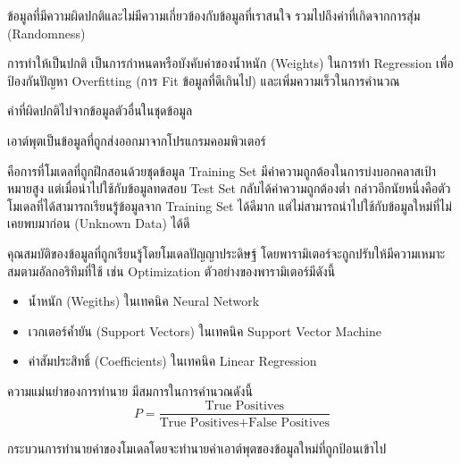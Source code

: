 \begin{description}[style=nextline]
    \item[Noise] ข้อมูลที่มีความผิดปกติและไม่มีความเกี่ยวข้องกับข้อมูลที่เราสนใจ รวมไปถึงค่าที่เกิดจากการสุ่ม (Randomness)

    \item[Normalization] การทำให้เป็นปกติ เป็นการกำหนดหรือบังคับค่าของน้ำหนัก (Weights) ในการทำ Regression เพื่อป้องกันปัญหา
    Overfitting (การ Fit ข้อมูลที่ดีเกินไป) และเพิ่มความเร็วในการคำนวณ

    \item[Outlier] ค่าที่ผิดปกติไปจากข้อมูลตัวอื่นในชุดข้อมูล

    \item[Output] เอาต์พุตเป็นข้อมูลที่ถูกส่งออกมาจากโปรแกรมคอมพิวเตอร์

    \item[Overfitting] คือการที่โมเดลที่ถูกฝึกสอนด้วยชุดข้อมูล Training Set มีค่าความถูกต้องในการบ่งบอกคลาสเป้าหมายสูง 
    แต่เมื่อนำไปใช้กับข้อมูลทดสอบ Test Set กลับได้ค่าความถูกต้องต่ำ กล่าวอีกนัยหนึ่งคือตัวโมเดลที่ได้สามารถเรียนรู้ข้อมูลจาก Training Set 
    ได้ดีมาก แต่ไม่สามารถนำไปใช้กับข้อมูลใหม่ที่ไม่เคยพบมาก่อน (Unknown Data) ได้ดี

    \item[Parameter] คุณสมบัติของข้อมูลที่ถูกเรียนรู้โดยโมเดลปัญญาประดิษฐ์ โดยพารามิเตอร์จะถูกปรับให้มีความเหมาะสมตามอัลกอริทึมที่ใช้
    เช่น Optimization ตัวอย่างของพารามิเตอร์มีดังนี้
    \begin{itemize}
        \item น้ำหนัก (Wegiths) ในเทคนิค Neural Network
        
        \item เวกเตอร์ค้ำยัน (Support Vectors) ในเทคนิค Support Vector Machine
        
        \item ค่าสัมประสิทธิ์ (Coefficients) ในเทคนิค Linear Regression
    \end{itemize}

    \item[Precision] ความแม่นยำของการทำนาย มีสมการในการคำนวณดังนี้
    \begin{equation}\label{eq:precision}
        P = \frac{\text{True Positives}}{\text{True Positives} + \text{False Positives}}
    \end{equation}

    \item[Prediction] กระบวนการทำนายค่าของโมเดลโดยจะทำนายค่าเอาต์พุตของข้อมูลใหม่ที่ถูกป้อนเข้าไป


\end{description}
